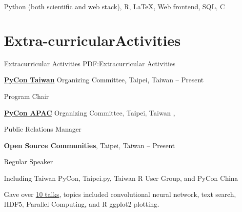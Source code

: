 \documentclass[a4paper,12pt,oneside]{article}
\begin{document}
\begin{body}
Python (both scientific and web stack),
R,
\LaTeX,
Web frontend,
SQL,
C

%


\section{Extra-\newline curricular\newline Activities}
{Extracurricular Activities}
{PDF:Extracurricular Activities}

\href{http://pycon.tw}{\textbf{PyCon Taiwan}} Organizing Committee, Taipei, Taiwan
\hfill
{} --
Present
\par
Program Chair

\EntryGapNoBreak
\href{http://pycon.tw}{\textbf{PyCon APAC}} Organizing Committee, Taipei, Taiwan
\hfill
{},
\par
Public Relations Manager

\BigEntryGapNoBreak
\textbf{Open Source Communities}, Taipei, Taiwan
\hfill
{} --
Present
\par
Regular Speaker
\begin{detail}
    \begin{detailitem}
    \item Including Taiwan PyCon, Taipei.py, Taiwan R User Group, and PyCon China
    \item Gave over \href{http://blog.liang2.tw/talks/#talks}{10 talks}, topics included
        convolutional neural network, text search,
        HDF5, Parallel Computing, and R ggplot2 plotting.
    \end{detailitem}
\end{detail}


\end{body}
\end{document}
